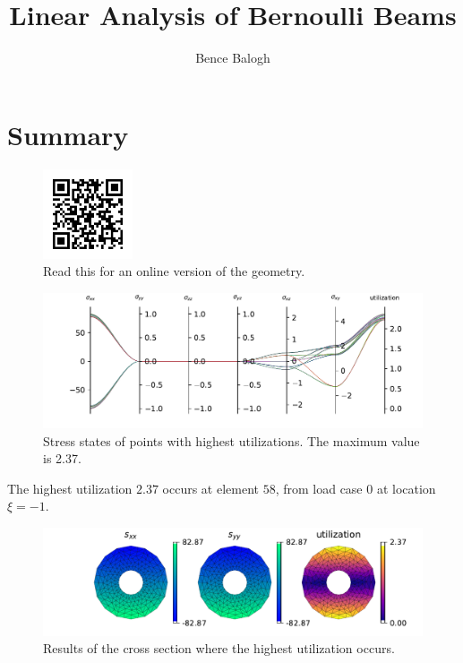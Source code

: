 \documentclass{article}%
\title{Linear Analysis of Bernoulli Beams}%
\author{Bence Balogh}%
\date{}%
\begin{document}
%
\normalsize%
\maketitle%
\hrulefill%
\tableofcontents%
\renewcommand{\arraystretch}{1.2}%
\setlength{\tabcolsep}{6pt}%
\section{Summary}%
\label{sec:Summary}%


\begin{figure}[h!]%
\centering%
\includegraphics[width=100px]{qrcode.png}%
\caption{Read this for an online version of the geometry.}%
\end{figure}

%


\begin{figure}[h!]%
\centering%
\includegraphics[width=\textwidth]{bernoulli_B2_parallel_1.pdf}%
\caption{Stress states of points with highest utilizations. The maximum value is 2.37.}%
\end{figure}

%
\newpage%
The highest utilization $2.37$ occurs at element $58$, from load case $0$ at location $\xi=-1$.%


\begin{figure}[h!]%
\centering%
\includegraphics[width=\textwidth]{cross section results.pdf}%
\caption{Results of the cross section where the highest utilization occurs.}%
\end{figure}
\end{document}
